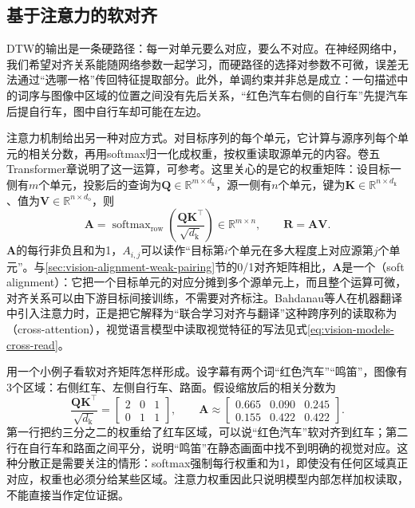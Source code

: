\subsection{基于注意力的软对齐}
\label{sec:vision-alignment-attention}

DTW的输出是一条硬路径：每一对单元要么对应，要么不对应。在神经网络中，我们希望对齐关系能随网络参数一起学习，而硬路径的选择对参数不可微，误差无法通过“选哪一格”传回特征提取部分。此外，单调约束并非总是成立：一句描述中的词序与图像中区域的位置之间没有先后关系，“红色汽车右侧的自行车”先提汽车后提自行车，图中自行车却可能在左边。

注意力机制给出另一种对应方式。对目标序列的每个单元，它计算与源序列每个单元的相关分数，再用softmax归一化成权重，按权重读取源单元的内容。卷五Transformer章说明了这一运算，可参考。这里关心的是它的权重矩阵：设目标一侧有$m$个单元，投影后的查询为$\bm Q\in\mathbb R^{m\times d_{\mathrm k}}$，源一侧有$n$个单元，键为$\bm K\in\mathbb R^{n\times d_{\mathrm k}}$、值为$\bm V\in\mathbb R^{n\times d_{\mathrm o}}$，则
\begin{equation}
  \bm A=\operatorname{softmax}_{\mathrm{row}}\!\left(\frac{\bm Q\bm K^\top}{\sqrt{d_{\mathrm k}}}\right)\in\mathbb R^{m\times n},
  \qquad
  \bm R=\bm A\bm V.
  \label{eq:vision-alignment-attention}
\end{equation}
$\bm A$的每行非负且和为1，$A_{i,j}$可以读作“目标第$i$个单元在多大程度上对应源第$j$个单元”。与\ref{sec:vision-alignment-weak-pairing}节的0/1对齐矩阵相比，$\bm A$是一个（soft alignment）：它把一个目标单元的对应分摊到多个源单元上，而且整个运算可微，对齐关系可以由下游目标间接训练，不需要对齐标注。Bahdanau等人在机器翻译中引入注意力时，正是把它解释为“联合学习对齐与翻译”这种跨序列的读取称为（cross-attention），视觉语言模型中读取视觉特征的写法见式\eqref{eq:vision-models-cross-read}。

用一个小例子看软对齐矩阵怎样形成。设字幕有两个词“红色汽车”“鸣笛”，图像有3个区域：右侧红车、左侧自行车、路面。假设缩放后的相关分数为
\[
  \frac{\bm Q\bm K^\top}{\sqrt{d_{\mathrm k}}}=
  \begin{bmatrix}2&0&1\\0&1&1\end{bmatrix},
  \qquad
  \bm A\approx
  \begin{bmatrix}0.665&0.090&0.245\\0.155&0.422&0.422\end{bmatrix}.
\]
第一行把约三分之二的权重给了红车区域，可以说“红色汽车”软对齐到红车；第二行在自行车和路面之间平分，说明“鸣笛”在静态画面中找不到明确的视觉对应。这种分散正是需要关注的情形：softmax强制每行权重和为1，即使没有任何区域真正对应，权重也必须分给某些区域。注意力权重因此只说明模型内部怎样加权读取，不能直接当作定位证据。

